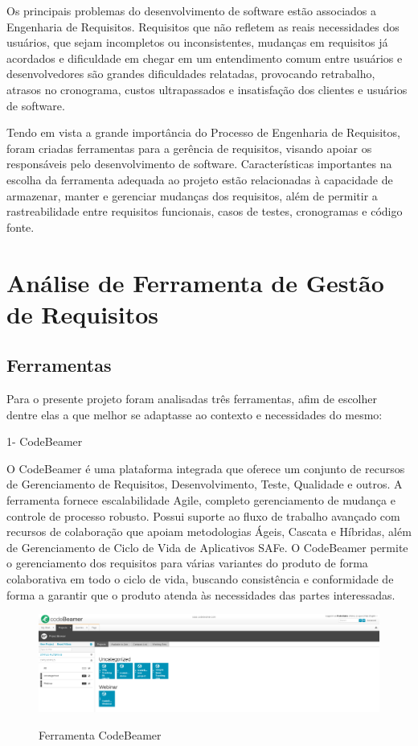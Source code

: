 Os principais problemas do desenvolvimento de software estão associados a Engenharia de Requisitos. Requisitos que não refletem as reais necessidades dos usuários, que sejam incompletos ou inconsistentes, mudanças em requisitos já acordados e dificuldade em chegar em um entendimento comum entre usuários e desenvolvedores são grandes dificuldades relatadas, provocando retrabalho, atrasos no cronograma, custos ultrapassados e insatisfação dos clientes e usuários de software. \cite{blaschek}

Tendo em vista a grande importância do Processo de Engenharia de Requisitos, foram criadas ferramentas para a gerência de requisitos, visando apoiar os responsáveis pelo desenvolvimento de software. Características importantes na escolha da ferramenta adequada ao projeto estão relacionadas à capacidade de  armazenar, manter e gerenciar mudanças dos requisitos, além de permitir a rastreabilidade entre requisitos funcionais, casos de testes, cronogramas e código fonte.


\section {Análise de Ferramenta de Gestão de Requisitos}

\subsection{Ferramentas}

Para o presente projeto foram analisadas três ferramentas, afim de escolher dentre elas a que melhor se adaptasse ao contexto e necessidades do mesmo:

1- CodeBeamer

O CodeBeamer é uma plataforma integrada que oferece um conjunto de recursos de Gerenciamento de Requisitos, Desenvolvimento, Teste, Qualidade e outros. A ferramenta fornece escalabilidade Agile, completo gerenciamento de mudança e controle de processo robusto. Possui suporte ao fluxo de trabalho avançado com recursos de colaboração que apoiam metodologias Ágeis, Cascata e Híbridas, além de Gerenciamento de Ciclo de Vida de Aplicativos SAFe. O CodeBeamer permite o gerenciamento dos requisitos para várias variantes do produto de forma colaborativa em todo o ciclo de vida, buscando consistência e conformidade de forma a garantir que o produto atenda às necessidades das partes interessadas.

\FloatBarrier
\begin{figure}[!htpd]
		\centering
		\includegraphics[scale=0.27]{figuras/Code}
		\label{img:SAF}
		\caption{Ferramenta CodeBeamer }
\end{figure}
\FloatBarrier



